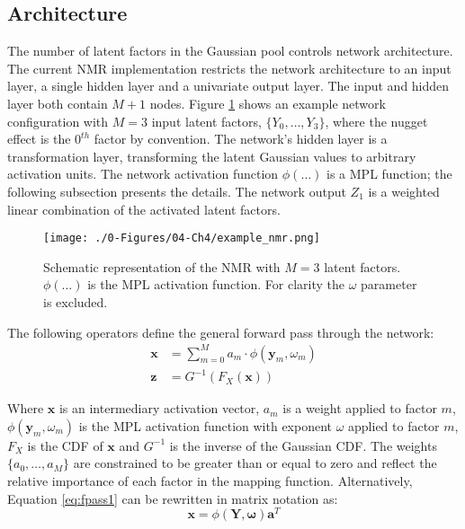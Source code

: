 \subsection{Architecture}
\label{subsec:04arch}

The number of latent factors in the Gaussian pool controls network architecture. The current \gls{NMR} implementation restricts the network architecture to an input layer, a single hidden layer and a univariate output layer. The input and hidden layer both contain $M+1$ nodes. Figure \ref{fig:example_nmr} shows an example network configuration with $M=3$ input latent factors, $\{ Y_{0}, \dots, Y_{3}\}$, where the nugget effect is the $0^{th}$ factor by convention. The network's hidden layer is a transformation layer, transforming the latent Gaussian values to arbitrary activation units. The network activation function $\phi(\dots)$ is a \gls{MPL} function; the following subsection presents the details. The network output $Z_{1}$ is a weighted linear combination of the activated latent factors.

\begin{figure}[htb!]
    \centering
    \texttt{[image: ./0-Figures/04-Ch4/example\_nmr.png]}
    \caption{Schematic representation of the \gls{NMR} with $M=3$ latent factors. $\phi(\dots)$ is the \gls{MPL} activation function. For clarity the $\omega$ parameter is excluded.}
    \label{fig:example_nmr}
\end{figure}

The following operators define the general forward pass through the network:
\begin{align}
    \label{eq:fpass1}
    \mathbf{x} & = \sum_{m=0}^{M}a_{m} \cdot \phi(\mathbf{y}_{m}, \omega_{m}) \\
    \label{eq:fpass2}
    \mathbf{z} & = G^{-1}\left( F_{X}\left(\mathbf{x} \right)\right)
\end{align}

Where $\mathbf{x}$ is an intermediary activation vector, $a_{m}$ is a weight applied to factor $m$, $\phi(\mathbf{y}_{m}, \omega_{m})$ is the \gls{MPL} activation function with exponent $\omega$ applied to factor $m$, $F_{X}$ is the \gls{CDF} of $\mathbf{x}$ and $G^{-1}$ is the inverse of the Gaussian \gls{CDF}. The weights $\{ a_{0}, \dots, a_{M}\}$ are constrained to be greater than or equal to zero and reflect the relative importance of each factor in the mapping function. Alternatively, Equation \ref{eq:fpass1} can be rewritten in matrix notation as:
\begin{equation}
    \mathbf{x} = \phi\left( \mathbf{Y}, \boldsymbol{\omega} \right) \mathbf{a}^{T}
    \label{eq:fpass3}
\end{equation}

